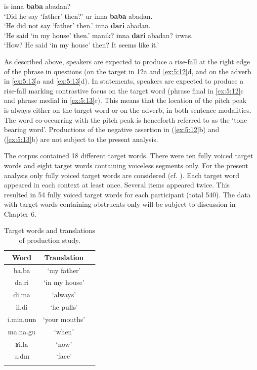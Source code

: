 \begin{exe}
\ex\label{ex:5:13} \begin{xlist}
                \ex\label{ex:5:13a} is inna \textbf{baba} abadan? \\		
                ‘Did he say ‘father’ then?’	
                \ex\label{ex:5:13b} ur inna \textbf{baba} abadan. \\			
                ‘He did not say ‘father’ then.’
                \ex\label{ex:5:13c} inna \textbf{dari} abadan. \\				
                ‘He said ‘in my house’ then.’
                \ex\label{ex:5:13d} manik? inna \textbf{dari} abadan? irwas. \\	 	
                ‘How? He said ‘in my house’ then? It seems like it.’
\end{xlist}
\end{exe} 

As described above, speakers are expected to produce a rise-fall at the right edge of the phrase in questions (on the target in 12a and \ref{ex:5:12}d, and on the adverb in \ref{ex:5:13}a and \ref{ex:5:13}d). In statements, speakers are expected to produce a rise-fall marking contrastive focus on the target word (phrase final in \ref{ex:5:12}c and phrase medial in \ref{ex:5:13}c). This means that the location of the pitch peak is always either on the target word or on the adverb, in both sentence modalities. The word co-occurring with the pitch peak is henceforth referred to as the ‘tone bearing word’. Productions of the negative assertion in (\ref{ex:5:12}b) and (\ref{ex:5:13}b) are not subject to the present analysis. 

The corpus contained 18 different target words. There were ten fully voiced target words and eight target words containing voiceless segments only. For the present analysis only fully voiced target words are considered (cf. ). Each target word appeared in each context at least once. Several items appeared twice. This resulted in 54 fully voiced target words for each participant (total 540). The data with target words containing obstruents only will be subject to discussion in Chapter 6. 

\begin{table}
  \begin{tabular}{ccc}
    \lsptoprule
\textbf{Word}  & \textbf{Translation} \\
    \midrule
ba.ba & ‘my father'\\
da.ri & ‘in my house'\\
di.ma & ‘always'\\
il.di & ‘he pulls'\\
i.min.nun & ‘your mouths'\\
ma.na.gu & ‘when'\\
ʁi.la & ‘now'\\
u.dm & ‘face'\\
\lspbottomrule
  \end{tabular}
  \caption{Target words and translations of production study.}
  \label{tab:5.1}
\end{table} 


